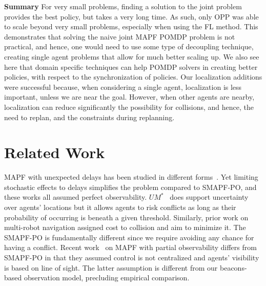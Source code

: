 \documentclass[letterpaper]{article}
\begin{document}
\noindent\textbf{Summary} For very small problems, finding a solution to the joint problem provides the best policy, but takes a very long time. As such, only OPP was able to scale beyond very small problems, especially when using the FL method. This demonstrates that solving the naive joint MAPF POMDP problem is not practical, and hence, one would need to use some type of decoupling technique, creating single agent problems that allow for much better scaling up.  We also see here that domain specific techniques can help POMDP solvers in creating better policies, with respect to the synchronization of policies. Our localization additions were successful because, when considering a single agent, localization is less important, unless we are near the goal. However, when other agents are nearby, localization can reduce significantly the possibility for collisions, and hence, the need to replan, and the constraints during replanning.




\vspace{-3.02mm}
\section{Related Work}

MAPF with unexpected delays has been studied in different forms~\cite{atzmon2020probabilistic,shahar2021safe,atzmon2020robust,ma2017multiAgent}. Yet limiting stochastic effects to delays simplifies the problem compared to SMAPF-PO, and these works all assumed perfect observability.
$UM^*$~\cite{wagner2017path} does support uncertainty over agents' locations but it allows agents to risk conflicts as long as their probability of occurring is beneath a given threshold. Similarly, prior work on multi-robot navigation assigned cost to collision and aim to minimize it.
The SMAPF-PO is fundamentally different since we require avoiding any chance for having a conflict. %
Recent work~\cite{davydov2021q} on MAPF with partial observability differs from SMAPF-PO in that they assumed control is not centralized and agents' visibility is based on line of sight. The latter assumption is different from our beacons-based observation model, precluding empirical comparison.
\end{document}
